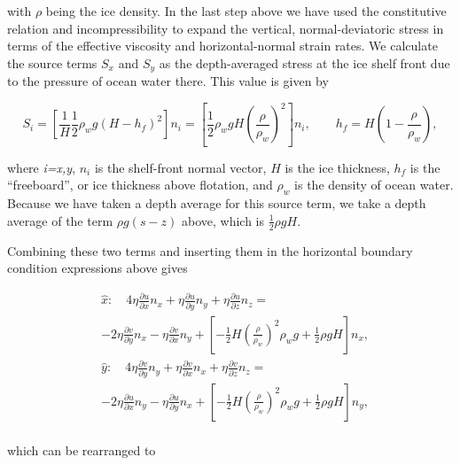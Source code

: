 \noindent
with \textit{\(\rho{}\)} being the ice density. In the last step above we have used the constitutive relation and incompressibility to expand the vertical, normal-deviatoric stress in terms of the effective viscosity and horizontal-normal strain rates. We calculate the source terms $S_x$ and $S_y$ as the depth-averaged stress at the ice shelf front due to the pressure of ocean water there. This value is given by

\begin{equation}
S_{i}=\left[ \frac{1}{H}\frac{1}{2}\rho _{w}g\left( H-h_f \right)^{2} \right]n_{i}=\left[ \frac{1}{2}\rho _{w}gH\left( \frac{\rho }{\rho _{w}} \right)^{2} \right]n_{i},\quad \quad h_f=H\left( 1-\frac{\rho _{{}}}{\rho _{w}} \right),
\end{equation}

\noindent
where  \textit{i=x,y}, $n_i$ is the shelf-front normal vector, $H$ is the ice thickness, $h_f$ is the ``freeboard'', or ice thickness above flotation, and $\rho_w$ is the density of ocean water. Because we have taken a depth average for this source term, we take a depth average of the term $\rho g\left( s-z \right)$ above, which is $\frac{1}{2}\rho gH$.

Combining these two terms and inserting them in the horizontal boundary condition expressions above gives

\begin{equation}
\begin{split}
& \hat{x}:\quad 4\eta \frac{\partial u}{\partial x}n_{x}+\eta \frac{\partial u}{\partial y}n_{y}+\eta \frac{\partial u}{\partial z}n_{z}= \\
& -2\eta \frac{\partial v}{\partial y}n_{x}-\eta \frac{\partial v}{\partial x}n_{y}+\left[ -\frac{1}{2}H\left( \frac{\rho }{\rho _{w}} \right)^{2}\rho _{w}g+\frac{1}{2}\rho gH \right]n_{x}, \\ 
 & \hat{y}:\quad 4\eta \frac{\partial v}{\partial y}n_{y}+\eta \frac{\partial v}{\partial x}n_{x}+\eta \frac{\partial v}{\partial z}n_{z}= \\
 & -2\eta \frac{\partial u}{\partial x}n_{y}-\eta \frac{\partial u}{\partial y}n_{x}+\left[ -\frac{1}{2}H\left( \frac{\rho }{\rho _{w}} \right)^{2}\rho _{w}g+\frac{1}{2}\rho gH \right]n_{y}, \\ 
\end{split}
\end{equation}

which can be rearranged to

